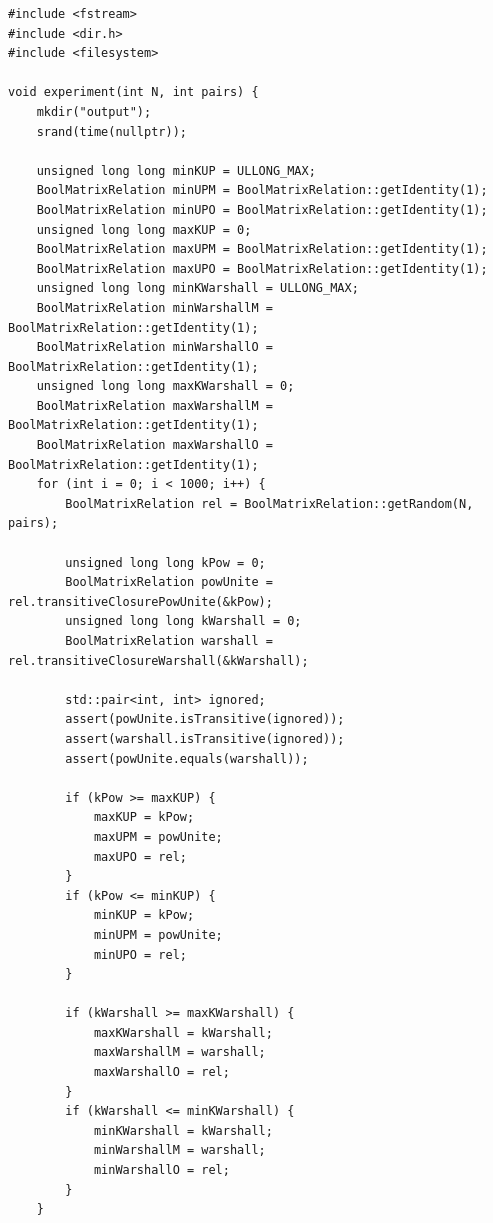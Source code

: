 \documentclass[a4paper,14pt]{extarticle}
\begin{document}
\begin{enumerate}[1.]
\begin{verbatim}
#include <fstream>
#include <dir.h>
#include <filesystem>

void experiment(int N, int pairs) {
    mkdir("output");
    srand(time(nullptr));
    
    unsigned long long minKUP = ULLONG_MAX;
    BoolMatrixRelation minUPM = BoolMatrixRelation::getIdentity(1);
    BoolMatrixRelation minUPO = BoolMatrixRelation::getIdentity(1);
    unsigned long long maxKUP = 0;
    BoolMatrixRelation maxUPM = BoolMatrixRelation::getIdentity(1);
    BoolMatrixRelation maxUPO = BoolMatrixRelation::getIdentity(1);
    unsigned long long minKWarshall = ULLONG_MAX;
    BoolMatrixRelation minWarshallM = BoolMatrixRelation::getIdentity(1);
    BoolMatrixRelation minWarshallO = BoolMatrixRelation::getIdentity(1);
    unsigned long long maxKWarshall = 0;
    BoolMatrixRelation maxWarshallM = BoolMatrixRelation::getIdentity(1);
    BoolMatrixRelation maxWarshallO = BoolMatrixRelation::getIdentity(1);
    for (int i = 0; i < 1000; i++) {
        BoolMatrixRelation rel = BoolMatrixRelation::getRandom(N, pairs);

        unsigned long long kPow = 0;
        BoolMatrixRelation powUnite = rel.transitiveClosurePowUnite(&kPow);
        unsigned long long kWarshall = 0;
        BoolMatrixRelation warshall = rel.transitiveClosureWarshall(&kWarshall);

        std::pair<int, int> ignored;
        assert(powUnite.isTransitive(ignored));
        assert(warshall.isTransitive(ignored));
        assert(powUnite.equals(warshall));

        if (kPow >= maxKUP) {
            maxKUP = kPow;
            maxUPM = powUnite;
            maxUPO = rel;
        }
        if (kPow <= minKUP) {
            minKUP = kPow;
            minUPM = powUnite;
            minUPO = rel;
        }

        if (kWarshall >= maxKWarshall) {
            maxKWarshall = kWarshall;
            maxWarshallM = warshall;
            maxWarshallO = rel;
        }
        if (kWarshall <= minKWarshall) {
            minKWarshall = kWarshall;
            minWarshallM = warshall;
            minWarshallO = rel;
        }
    }


\end{verbatim}
\end{enumerate}
\end{document}

